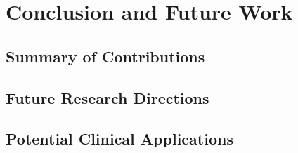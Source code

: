 
\chapter{Conclusion and Future Work}

\section{Summary of Contributions}

\section{Future Research Directions}

\section{Potential Clinical Applications}

